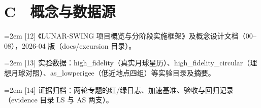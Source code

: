 \documentclass[UTF8,fontset=none]{ctexbook}
\begin{document}
\section*{C　概念与数据源}
\noindent\hangindent=2em [12] 《LUNAR-SWING 项目概览与分阶段实施框架》及概念设计文档（00–08），2026-04 版（docs/excursion 目录）。\par
\noindent\hangindent=2em [13] 实验数据：high\_fidelity（真实月球星历）、high\_fidelity\_circular（理想月球对照）、as\_lowperigee（低近地点四组）等实验目录及摘要。\par
\noindent\hangindent=2em [14] 证据归档：两轮专题的红/绿日志、加速基准、验收与回归记录（evidence 目录 LS 与 AS 两支）。\par
\end{document}

